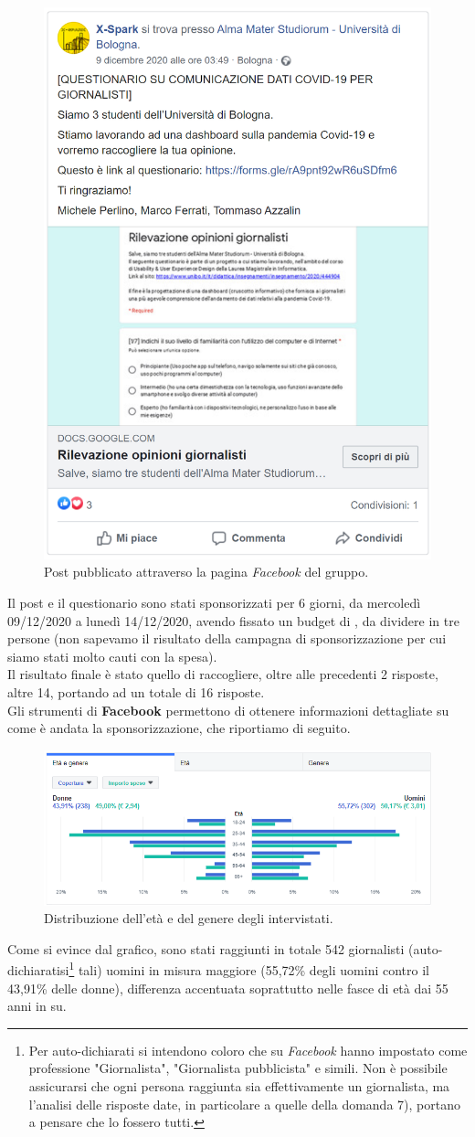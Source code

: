 \begin{figure}[!h] 
    \centering 
    \includegraphics[width=0.4\columnwidth]{assets/images/ricerca-etnografica/post-facebook} 
    \caption{Post pubblicato attraverso la pagina \textit{Facebook} del gruppo.}
\end{figure}

Il post e il questionario sono stati sponsorizzati per 6 giorni, da mercoledì 09/12/2020 a lunedì 14/12/2020, avendo fissato un budget di , da dividere in tre persone (non sapevamo il risultato della campagna di sponsorizzazione per cui siamo stati molto cauti con la spesa).\\
Il risultato finale è stato quello di raccogliere, oltre alle precedenti 2 risposte, altre 14, portando ad un totale di 16 risposte.\\
Gli strumenti di \textbf{Facebook} permettono di ottenere informazioni dettagliate su come è andata la sponsorizzazione, che riportiamo di seguito.

\begin{figure}[!h] 
    \centering 
    \includegraphics[width=0.9\columnwidth]{assets/images/ricerca-etnografica/post-facebook-statistiche-eta-genere} 
    \caption{Distribuzione dell'età e del genere degli intervistati.}
\end{figure}
Come si evince dal grafico, sono stati raggiunti in totale 542 giornalisti (auto-dichiaratisi\footnote{Per auto-dichiarati si intendono coloro che su \textit{Facebook} hanno impostato come professione "Giornalista", "Giornalista pubblicista" e simili. Non è possibile assicurarsi che ogni persona raggiunta sia effettivamente un giornalista, ma l'analisi delle risposte date, in particolare a quelle della domanda 7), portano a pensare che lo fossero tutti.} tali) uomini in misura maggiore (55,72\% degli uomini contro il 43,91\% delle donne), differenza accentuata soprattutto nelle fasce di età dai 55 anni in su.

